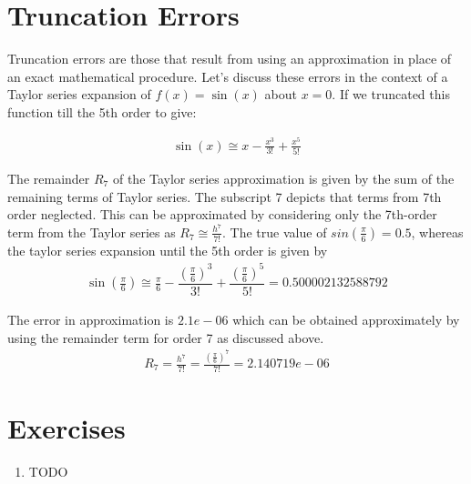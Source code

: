 \documentclass[book.tex]{subfiles}
\begin{document}
\section{Truncation Errors}

Truncation errors are those that result from using an approximation in place of an exact mathematical procedure. Let's discuss these errors in the context of a Taylor series expansion of $f(x) = \sin(x)$ about $x=0$. If we truncated this function till the 5th order to give:

\begin{align}
	\sin(x) \cong x - \frac{x^3}{3!} + \frac{x^5}{5!}
\end{align}

The remainder $R_7$ of the Taylor series approximation is given by the sum of the remaining terms of Taylor series. The subscript 7 depicts that terms from 7th order neglected. This can be approximated by considering only the 7th-order term from the Taylor series as 	${R_7} \cong \frac{h^7}{7!} $. The true value of $sin(\frac{\pi}{6}) = 0.5$, whereas the taylor series expansion until the 5th order is given by
\begin{align}
\sin(\frac{\pi}{6})  \cong \frac{\pi}{6} - \dfrac{(\frac{\pi}{6})^3}{3!}  + \dfrac{(\frac{\pi}{6})^5}{5!}  =  0.500002132588792
\end{align}

The error in approximation is $2.1e-06$ which can be obtained approximately by using the remainder term for order 7 as discussed above. 
\begin{align}
R_7 =  \frac{h^7}{7!} = \frac{(\frac{\pi}{6})^7}{7!} = 2.140719e-06
\end{align}

\section{Exercises}
\begin{enumerate}
    \item TODO
\end{enumerate}
\end{document}
